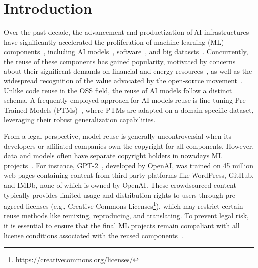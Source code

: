 \section{Introduction}
Over the past decade, the advancement and productization of AI infrastructures have significantly accelerated the proliferation of machine learning (ML) components~\cite{jiang2023empirical}, including AI models~\cite{rombach2022high, touvron2023llama}, software~\cite{wolf2020transformers, he2022fastermoe}, and big datasets~\cite{gao2020the, schuhmann2022laion}.
Concurrently, the reuse of these components has gained popularity, motivated by concerns about their significant demands on financial and energy resources~\cite{strubell2019energy}, as well as the widespread recognition of the value advocated by the open-source movement~\cite{rosen2005open}.
Unlike code reuse in the OSS field, the reuse of AI models follow a distinct schema.
A frequently employed approach for AI models reuse is fine-tuning Pre-Trained Models (PTMs)~\cite{han2021pre, touvron2023llama}, where PTMs are adapted on a domain-specific dataset, leveraging their robust generalization capabilities. 

From a legal perspective, model reuse is generally uncontroversial when its developers or affiliated companies own the copyright for all components.
However, data and models often have separate copyright holders in nowadays ML projects~\cite{rajbahadur2021can, radford2019language, scao2022bloom, zeng2023glm}.
For instance, GPT-2~\cite{radford2019language}, developed by OpenAI, was trained on 45 million web pages containing content from third-party platforms like WordPress, GitHub, and IMDb, none of which is owned by OpenAI.
These crowdsourced content typically provides limited usage and distribution rights to users through pre-agreed licenses (e.g., Creative Commons Licenses\footnote{https://creativecommons.org/licenses/}), which may restrict certain reuse methods like remixing, reproducing, and translating. 
To prevent legal risk, it is essential to ensure that the final ML projects remain compaliant with all license conditions associated with the reused components~\cite{cui2023empirical, mathur2012empirical, kapitsaki2017automating}.

